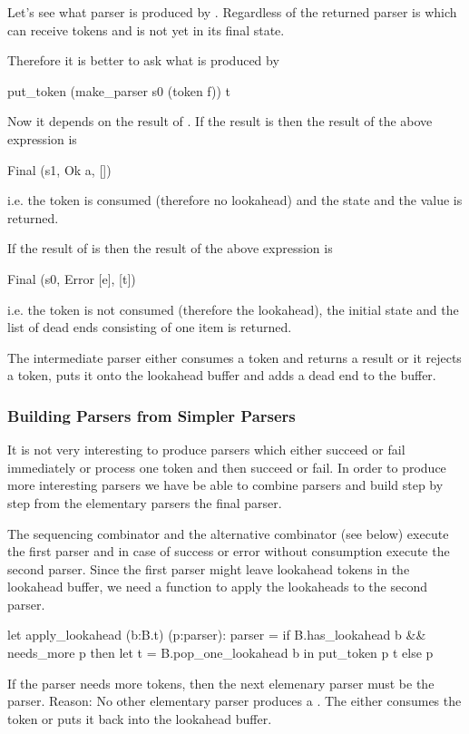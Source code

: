 Let's see what parser is produced by . Regardless of  the returned parser is  which
can receive tokens and is not yet in its final state.

Therefore it is better to ask what is produced by
\begin{ocaml}
  put_token (make_parser s0 (token f)) t
\end{ocaml}
Now it depends on the result of . If the result is  then the result of the above expression is
%
\begin{ocaml}
  Final (s1, Ok a, [])
\end{ocaml}
%
i.e. the token is consumed (therefore no lookahead) and the state 
and the value  is returned.

If the result of  is  then the result of the above
expression is
%
\begin{ocaml}
  Final (s0, Error [e], [t])
\end{ocaml}
%
i.e. the token is not consumed (therefore the lookahead), the initial state
and the list of dead ends consisting of one item is returned.

The intermediate parser  either consumes a token and returns a
result or it rejects a token, puts it onto the lookahead buffer and adds a
dead end to the buffer.

\subsubsection{Building Parsers from Simpler Parsers}

It is not very interesting to produce parsers which either succeed or fail
immediately or process one token and then succeed or fail. In order to produce
more interesting parsers we have be able to combine parsers and build step by
step from the elementary parsers the final parser.

The sequencing combinator \code{>>=} and the alternative combinator \code{<|>}
(see below) execute the first parser and in case of success or error without
consumption execute the second parser. Since the first parser might leave
lookahead tokens in the lookahead buffer, we need a function to apply the
lookaheads to the second parser.

\begin{ocaml}
  let apply_lookahead (b:B.t) (p:parser): parser =
    if B.has_lookahead b && needs_more p  then
      let t = B.pop_one_lookahead b in
      put_token p t
    else
      p
\end{ocaml}
%
If the parser needs more tokens, then the next elemenary parser must be the
 parser. Reason: No other elementary parser produces a . The  either consumes the token or puts it back into
the lookahead buffer.

